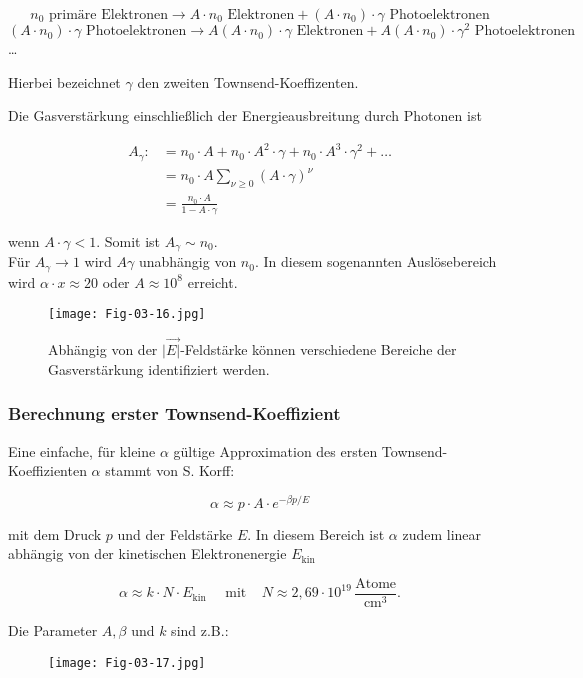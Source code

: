 \[n_0 \text{ primäre Elektronen} \longrightarrow A\cdot n_0 \text{ Elektronen} + (A\cdot n_0)\cdot
\gamma \text{ Photoelektronen}\]
\[(A\cdot n_0)\cdot\gamma \text{ Photoelektronen} \longrightarrow A(A\cdot n_0)\cdot \gamma
\text{ Elektronen} + A(A\cdot n_0)\cdot \gamma^2 \text{ Photoelektronen}\]
\ldots

Hierbei bezeichnet $\gamma$ den zweiten Townsend-Koeffizenten.

Die Gasverstärkung einschließlich der Energieausbreitung durch Photonen ist


\begin{align*}
A_\gamma :&= n_0\cdot A + n_0\cdot A^2\cdot\gamma + n_0\cdot A^3\cdot\gamma^2 + \ldots\\
&=n_0\cdot A \sum_{\nu\geq0}(A\cdot\gamma)^\nu  \\
&= \frac{n_0\cdot A}{1- A\cdot\gamma}
\end{align*}

wenn $A\cdot\gamma<1$. Somit ist $A_\gamma\sim n_0$.
\\
Für $A_\gamma\rightarrow 1$ wird $A\gamma$ unabhängig von $n_0$. In diesem sogenannten
Auslösebereich wird $\alpha\cdot x\approx 20$ oder $A\approx10^8$ erreicht.

\begin{figure}[H]
	\centering
	\texttt{[image: Fig-03-16.jpg]}
	\caption{Abhängig von der $|\vec{E|}$-Feldstärke können verschiedene Bereiche der Gasverstärkung
	identifiziert werden.}
\end{figure}

\subsubsection*{Berechnung erster Townsend-Koeffizient}

Eine einfache, für kleine $\alpha$ gültige Approximation des ersten Townsend-Koeffizienten $\alpha$
stammt von S. Korff:

\[\alpha \approx p\cdot A\cdot e^{-\beta p/E}  \]

mit dem Druck $p$ und der Feldstärke $E$. In diesem Bereich ist $\alpha$ zudem linear abhängig von
der kinetischen Elektronenergie $E_\text{kin}$

\[\alpha \approx k\cdot N \cdot E_\text{kin} ~~~~~~ \text{mit}~~~~~N\approx 2{,}69\cdot
10^{19}\,\frac{\text{Atome}}{\text{cm}^3}.\]

Die Parameter $A, \beta$ und $k$ sind z.B.:

\begin{figure}[H]
	\centering
	\texttt{[image: Fig-03-17.jpg]}
\end{figure}

